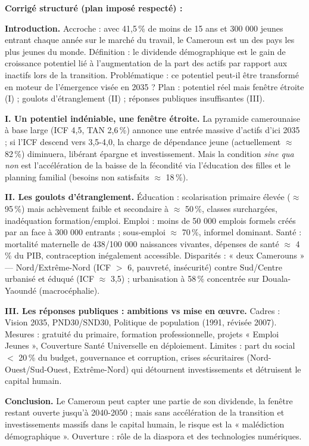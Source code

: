 \documentclass[11pt]{article}
\begin{document}
\begin{corrige}
\textbf{Corrigé structuré (plan imposé respecté) :}

\textbf{Introduction.} Accroche : avec 41,5\,\% de moins de 15 ans et 300 000 jeunes entrant chaque année sur le marché du travail, le Cameroun est un des pays les plus jeunes du monde. Définition : le dividende démographique est le gain de croissance potentiel lié à l'augmentation de la part des actifs par rapport aux inactifs lors de la transition. Problématique : ce potentiel peut-il être transformé en moteur de l'émergence visée en 2035 ? Plan : potentiel réel mais fenêtre étroite (I) ; goulots d'étranglement (II) ; réponses publiques insuffisantes (III).

\textbf{I. Un potentiel indéniable, une fenêtre étroite.} La pyramide camerounaise à base large (ICF 4,5, TAN 2,6\,\%) annonce une entrée massive d'actifs d'ici 2035 ; si l'ICF descend vers 3,5-4,0, la charge de dépendance jeune (actuellement $\approx$ 82\,\%) diminuera, libérant épargne et investissement. Mais la condition \emph{sine qua non} est l'accélération de la baisse de la fécondité via l'éducation des filles et le planning familial (besoins non satisfaits $\approx$ 18\,\%).

\textbf{II. Les goulots d'étranglement.} Éducation : scolarisation primaire élevée ($\approx$ 95\,\%) mais achèvement faible et secondaire à $\approx$ 50\,\%, classes surchargées, inadéquation formation/emploi. Emploi : moins de 50 000 emplois formels créés par an face à 300 000 entrants ; sous-emploi $\approx$ 70\,\%, informel dominant. Santé : mortalité maternelle de 438/100 000 naissances vivantes, dépenses de santé $\approx$ 4\,\% du PIB, contraception inégalement accessible. Disparités : « deux Camerouns » — Nord/Extrême-Nord (ICF $>$ 6, pauvreté, insécurité) contre Sud/Centre urbanisé et éduqué (ICF $\approx$ 3,5) ; urbanisation à 58\,\% concentrée sur Douala-Yaoundé (macrocéphalie).

\textbf{III. Les réponses publiques : ambitions vs mise en œuvre.} Cadres : Vision 2035, PND30/SND30, Politique de population (1991, révisée 2007). Mesures : gratuité du primaire, formation professionnelle, projets « Emploi Jeunes », Couverture Santé Universelle en déploiement. Limites : part du social $<$ 20\,\% du budget, gouvernance et corruption, crises sécuritaires (Nord-Ouest/Sud-Ouest, Extrême-Nord) qui détournent investissements et détruisent le capital humain.

\textbf{Conclusion.} Le Cameroun peut capter une partie de son dividende, la fenêtre restant ouverte jusqu'à 2040-2050 ; mais sans accélération de la transition et investissements massifs dans le capital humain, le risque est la « malédiction démographique ». Ouverture : rôle de la diaspora et des technologies numériques.
\end{corrige}
\end{document}
